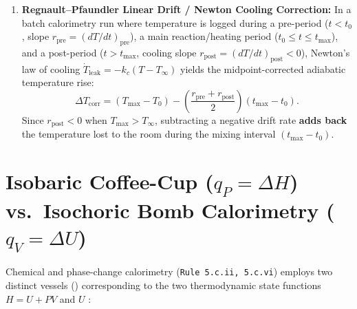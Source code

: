 \begin{enumerate}
  \begin{equation}\label{eq:04:flowcancel}
    c_p = \frac{V_2 I_2 - V_1 I_1}{(\dot{m}_2 - \dot{m}_1)(T_{\mathrm{out}} - T_{\mathrm{in}})}.
  \end{equation}
  \item \textbf{Regnault--Pfaundler Linear Drift / Newton Cooling Correction:}
  In a batch calorimetry run where temperature is logged during a pre-period ($t < t_0$, slope $r_{\mathrm{pre}} = (dT/dt)_{\mathrm{pre}}$), a main reaction/heating period ($t_0 \leq t \leq t_{\max}$), and a post-period ($t > t_{\max}$, cooling slope $r_{\mathrm{post}} = (dT/dt)_{\mathrm{post}} < 0$), Newton's law of cooling $\dot{T}_{\mathrm{leak}} = -k_c(T - T_\infty)$ yields the midpoint-corrected adiabatic temperature rise:
  \begin{equation}\label{eq:04:drift}
    \Delta T_{\mathrm{corr}} = (T_{\max} - T_0) - \left(\frac{r_{\mathrm{pre}} + r_{\mathrm{post}}}{2}\right)(t_{\max} - t_0).
  \end{equation}
  Since $r_{\mathrm{post}} < 0$ when $T_{\max} > T_\infty$, subtracting a negative drift rate \textbf{adds back} the temperature lost to the room during the mixing interval $(t_{\max} - t_0)$.
\end{enumerate}

\section{Isobaric Coffee-Cup ($q_P = \Delta H$) vs.\ Isochoric Bomb Calorimetry ($q_V = \Delta U$)}
\label{sec:04.5}

Chemical and phase-change calorimetry (\texttt{Rule 5.c.ii, 5.c.vi}) employs two distinct vessels () corresponding to the two thermodynamic state functions $H = U + PV$ and $U$ :

